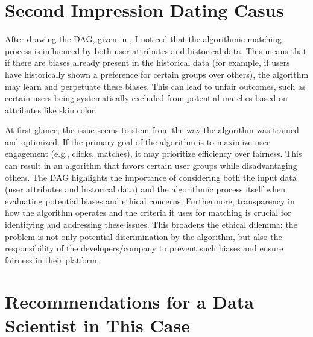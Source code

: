 \documentclass[11pt, twoside]{article}
\numberwithin{equation}{section}
\newcommand{\fullref}[1]{\hyperref[#1]{\Cref{#1}}}
\begin{document}
\section{Second Impression Dating Casus}
After drawing the DAG, given in \fullref{fig:DAG}, I noticed that the algorithmic matching process is influenced by both user attributes and historical data. This means that if there are biases already present in the historical data (for example, if users have historically shown a preference for certain groups over others), the algorithm may learn and perpetuate these biases. This can lead to unfair outcomes, such as certain users being systematically excluded from potential matches based on attributes like skin color.

At first glance, the issue seems to stem from the way the algorithm was trained and optimized. If the primary goal of the algorithm is to maximize user engagement (e.g., clicks, matches), it may prioritize efficiency over fairness. This can result in an algorithm that favors certain user groups while disadvantaging others. The DAG highlights the importance of considering both the input data (user attributes and historical data) and the algorithmic process itself when evaluating potential biases and ethical concerns. Furthermore, transparency in how the algorithm operates and the criteria it uses for matching is crucial for identifying and addressing these issues. This broadens the ethical dilemma: the problem is not only potential discrimination by the algorithm, but also the responsibility of the developers/company to prevent such biases and ensure fairness in their platform.

\section{Recommendations for a Data Scientist in This Case}

\clearpage

\printbibliography[heading=bibintoc]
\end{document}
